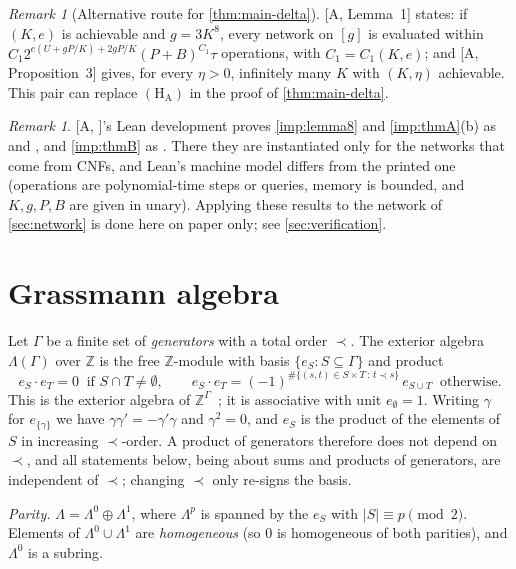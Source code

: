 \documentclass[11pt]{amsart}
\theoremstyle{plain}
\theoremstyle{definition}
\theoremstyle{remark}
\newtheorem{remark}[theorem]{Remark}
\numberwithin{equation}{section}
\newcommand{\Z}{\mathbb{Z}}
\newcommand{\A}[1][]{\textup{[A\if\relax\detokenize{#1}\relax\else, #1\fi]}}
\begin{document}
\begin{remark}[Alternative route for \cref{thm:main-delta}]\label{rem:alt-route}
\A[Lemma~1] states: if $(K,e)$ is achievable and $g=3K^8$, every network on $[g]$ is evaluated
within $C_1 2^{e(U+gP/K)+2gP/K}(P+B)^{C_1}\tau$ operations, with $C_1=C_1(K,e)$; and
\A[Proposition~3] gives, for every $\eta>0$, infinitely many $K$ with $(K,\eta)$ achievable. This
pair can replace $(\mathrm{H}_{\mathrm{A}})$ in the proof of \cref{thm:main-delta}.
\end{remark}

\begin{remark}
\A's Lean development proves \cref{imp:lemma8} and \cref{imp:thmA}(b) as
 and , and \cref{imp:thmB}
as . There they are instantiated only for the networks that come
from CNFs, and Lean's machine model differs from the printed one (operations are polynomial-time
steps or queries, memory is bounded, and $K,g,P,B$ are given in unary). Applying these results to
the network of \cref{sec:network} is done here on paper only; see \cref{sec:verification}.
\end{remark}

\section{Grassmann algebra}\label{sec:grassmann}

Let $\Gamma$ be a finite set of \emph{generators} with a total order $\prec$. The exterior algebra
$\Lambda(\Gamma)$ over $\Z$ is the free $\Z$-module with basis $\{e_S : S\subseteq\Gamma\}$ and
product
\[
  e_S\cdot e_T=0\ \text{ if } S\cap T\ne\emptyset,\qquad
  e_S\cdot e_T=(-1)^{\#\{(s,t)\in S\times T\,:\,t\prec s\}}\,e_{S\cup T}\ \text{ otherwise}.
\]
This is the exterior algebra of $\Z^\Gamma$~\cite[Ch.~III, \S7]{Bourbaki89}; it is associative
with unit $e_\emptyset=1$. Writing $\gamma$ for $e_{\{\gamma\}}$ we have $\gamma\gamma'=-\gamma'\gamma$
and $\gamma^2=0$, and $e_S$ is the product of the elements of $S$ in increasing $\prec$-order. A
product of generators therefore does not depend on $\prec$, and all statements below, being about
sums and products of generators, are independent of $\prec$; changing $\prec$ only re-signs the
basis.

\emph{Parity.} $\Lambda=\Lambda^0\oplus\Lambda^1$, where $\Lambda^p$ is spanned by the $e_S$ with
$|S|\equiv p\pmod 2$. Elements of $\Lambda^0\cup\Lambda^1$ are \emph{homogeneous} (so $0$ is
homogeneous of both parities), and $\Lambda^0$ is a subring.
\end{document}
